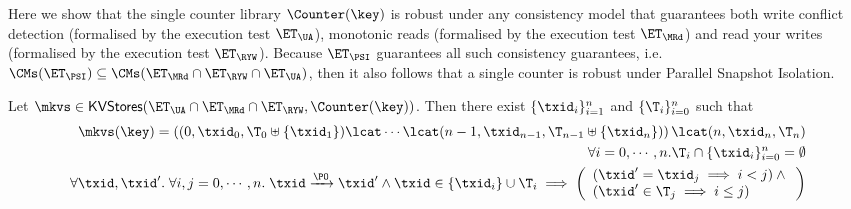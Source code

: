 Here we show that the  single counter library $\Counter(\key)$ is robust under any consistency model 
that guarantees both write conflict detection (formalised by the execution test 
$\ET_{\UA}$), monotonic reads (formalised by the execution test $\ET_{\MRd}$) 
and read your writes (formalised by the execution test $\ET_{\RYW}$). 
Because $\ET_{\PSI}$ guarantees all such consistency guarantees, i.e. 
$\CMs(\ET_{\PSI}) \subseteq \CMs(\ET_{\MRd} \cap \ET_{\RYW} \cap \ET_{\UA})$, 
then it also follows that a single counter is robust under Parallel Snapshot Isolation.
\begin{proposition}
\label{prop:counter_hhshape}
Let $\mkvs \in \mathsf{KVStores}(\ET_{\UA} \cap \ET_{\MRd} \cap \ET_{\RYW}, \Counter(\key))$. 
Then there exist $\{\txid_i\}_{i = 1}^{n}$ and $\{\T_{i}\}_{i = 0}^{n}$ such that 
\begin{align}
\mkvs(\key) = \left( (0, \txid_{0}, \T_{0} \uplus \{\txid_1\}) \lcat \cdots \lcat (n-1, \txid_{n-1}, \T_{n-1} \uplus \{\txid_{n}\}) \right) 
\lcat (n, \txid_{n}, \T_{n}) \label{eq:psi_counter_shape}\\
\forall i=0,\cdots,n.\T_{i} \cap \{\txid_{i}\}_{i=0}^{n} = \emptyset \label{eq:psi_counter_rwtxs}\\
\forall \txid, \txid'.\;\forall i,j=0,\cdots, n.\; \txid \xrightarrow{\PO} \txid' 
\wedge \txid \in \{\txid_{i}\} \cup \T_{i} \implies 
\left(\begin{array}{l}
(\txid' = \txid_{j} \implies i < j) \wedge {} \\
(\txid' \in \T_{j} \implies i \leq j) \\
\end{array}\right) \label{eq:psi_counter_so}
\end{align}
%
%
%
\end{proposition}


